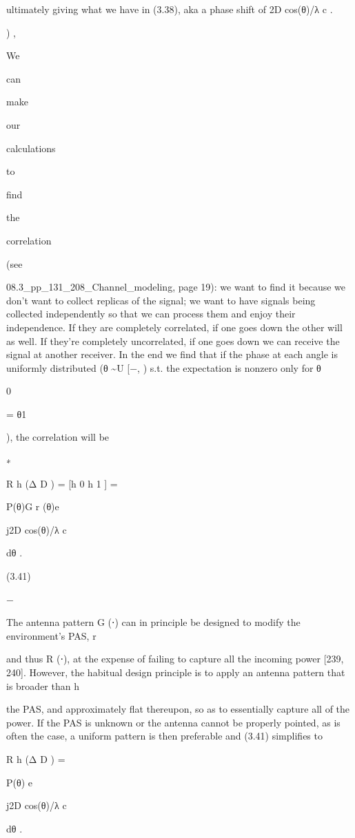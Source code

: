 {{{{ultimately giving what we have in (3.38), aka a phase shift of 2 D cos(θ)/λ c .

) ,

We

can

make

our

calculations

to

find

the

correlation

(see

08.3_pp_131_208_Channel_modeling, page 19): we want to find it because we don't want to collect replicas of the signal; we want to have signals being collected independently so that we can process them and enjoy their independence.
If they are completely correlated, if one goes down the other will as well. If they're completely uncorrelated, if one goes down we can receive the signal at another receiver.
In the end we find that if the phase at each angle is uniformly distributed (θ \sim U [−\pi, \pi)
s.t. the expectation is nonzero only for θ

0

= θ1

), the correlation will be

\pi
∗

R h (Δ D ) = [h 0 h 1 ] = \int

P(θ)G r (θ)e

j2 D cos(θ)/λ c

dθ .

(3.41)

−\pi

The antenna pattern G (⋅) can in principle be designed to modify the environment’s PAS,
r

and thus R (⋅), at the expense of failing to capture all the incoming power [239, 240].
However, the habitual design principle is to apply an antenna pattern that is broader than h

the PAS, and approximately flat thereupon, so as to essentially capture all of the power.
If the PAS is unknown or the antenna cannot be properly pointed, as is often the case, a uniform pattern is then preferable and (3.41) simplifies to
\pi

R h (Δ D ) = \int

P(θ) e

j2 D cos(θ)/λ c

dθ .

}}}}
